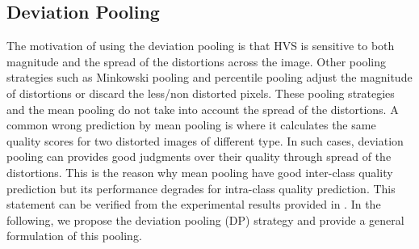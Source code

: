 \subsection{Deviation Pooling}


The motivation of using the deviation pooling is that HVS is sensitive to both magnitude and the spread of the distortions across the image. Other pooling strategies such as Minkowski pooling and percentile pooling adjust the magnitude of distortions or discard the less/non distorted pixels. These pooling strategies and the mean pooling do not take into account the spread of the distortions. A common wrong prediction by mean pooling is where it calculates the same quality scores for two distorted images of different type. In such cases, deviation pooling can provides good judgments over their quality through spread of the distortions. This is the reason why mean pooling have good inter-class quality prediction but its performance degrades for intra-class quality prediction. This statement can be verified from the experimental results provided in \cite{GMSD}. In the following, we propose the deviation pooling (DP) strategy and provide a general formulation of this pooling. 

